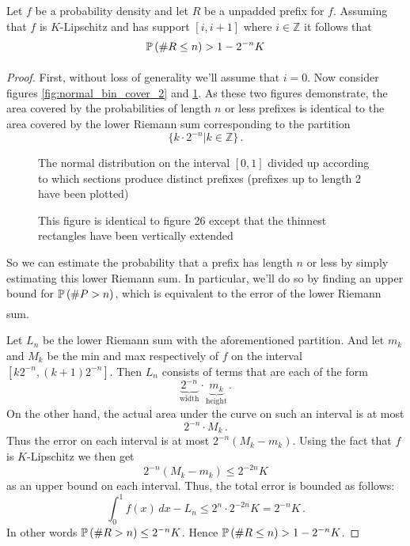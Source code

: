 \begin{proposition}\label{a}
	Let $f$ be a probability density and let $R$ be a unpadded prefix for $f$. Assuming that $f$ is $K$-Lipschitz and has support $[i,i+1]$ where $i\in\mathbb{Z}$ it follows that  
	\[
	\underset{}{\mathbb{P}}\left(\#R \leq n\right) >1-2^{-n}K
	\]
\end{proposition}
\begin{proof}
First, without loss of generality we'll assume that $i=0$. Now consider figures \ref{fig:normal_bin_cover_2} and \ref{fig:normal_bin_cover_riemann}. As these two figures demonstrate, the area covered by the probabilities of length $n$ or less prefixes is identical to the area covered by the lower Riemann sum corresponding to the partition
\[
\{k\cdot2^{-n}|k\in\mathbb{Z}\}\,.
\]

\begin{figure}[h]
	\centering
	
	\caption{The normal distribution on the interval $[0,1]$ divided up according to which sections produce distinct prefixes (prefixes up to length 2 have been plotted)}
	\label{fig:normal_bin_cover_2}\vspace{2em}
	
	
	\caption{This figure is identical to figure 26 except that the thinnest rectangles have been vertically extended}
	\label{fig:normal_bin_cover_riemann}
\end{figure}

So we can estimate the probability that a prefix has length $n$ or less by simply estimating this lower Riemann sum. In particular, we'll do so by finding an upper bound for $\underset{}{\mathbb{P}}\left(\#P>n\right)$, which is equivalent to the error of the lower Riemann sum.

Let $L_n$ be the lower Riemann sum with the aforementioned partition. And let $m_k$ and $M_k$ be the min and max respectively of $f$ on the interval $[k2^{-n}, (k+1)2^{-n}]$. Then $L_n$ consists of terms that are each of the form
\[
\underbrace{2^{-n}}_{\text{width}} \cdot \underbrace{m_k}_{\text{height}}\,.
\]
On the other hand, the actual area under the curve on such an interval is at most
\[
2^{-n} \cdot M_k\,.
\]
Thus the error on each interval is at most $2^{-n}(M_k-m_k)$. Using the fact that $f$ is $K$-Lipschitz we then get
\[
2^{-n}(M_k-m_k)\leq 2^{-2n}K
\]
as an upper bound on each interval. Thus, the total error is bounded as follows:
\[
\int_0^1f(x)\,dx - L_n \leq 2^n\cdot 2^{-2n}K = 2^{-n}K\,.
\]
In other words $\underset{}{\mathbb{P}}\left(\#R>n\right)\leq2^{-n}K$. Hence $\underset{}{\mathbb{P}}\left(\#R\leq n\right)>1-2^{-n}K$.
\end{proof}

